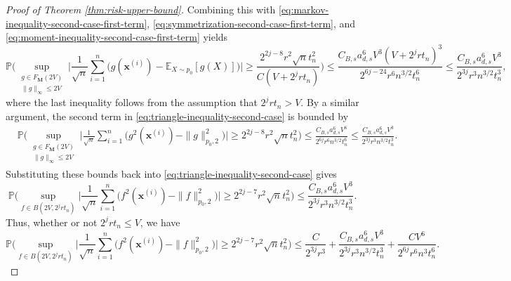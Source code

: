 \documentclass[10pt]{article}
\newcommand{\E}{{\mathbb E}}
\renewcommand{\P}{{\mathbb P}}
\newcommand{\xbf}{{\mathbf{x}}}
\newcommand{\Mbf}{{\mathbf{M}}}
\begin{document}
\begin{proof}[Proof of Theorem \ref{thm:risk-upper-bound}]
Combining this with \eqref{eq:markov-inequality-second-case-first-term}, 
\eqref{eq:symmetrization-second-case-first-term}, and
\eqref{eq:moment-inequality-second-case-first-term} yields
\begin{equation*}
    \P\Big(\sup_{\substack{g \in F_{\Mbf}(2V) \\ \|g\|_{\infty} \le 2V}} 
    \Big|\frac{1}{\sqrt{n}} \sum_{i = 1}^{n} \big(g(\xbf^{(i)}) 
    - \E_{X \sim p_0}[g(X)]\big)\Big| 
    \ge \frac{2^{2j - 8} r^2 \sqrt{n}t_n^2}{C(V + 2^j r t_n)} \Big) \le \frac{C_{B, s} 
    a_{d, s}^6 V^3(V + 2^j r t_n)^3}{2^{6j - 24} r^6 n^{3/2} t_n^6}
    \le \frac{C_{B, s} a_{d, s}^6 V^3}{2^{3j} r^3 n^{3/2} t_n^3},
\end{equation*}
where the last inequality follows from the assumption that $2^j r t_n > V$.
By a similar argument, the second term in
\eqref{eq:triangle-inequality-second-case} is bounded by
\begin{equation*}
\begin{aligned}
    &\P\Big(\sup_{\substack{g \in F_{\Mbf}(2V) \\ \|g\|_{\infty} \le 2V}} 
    \Big|\frac{1}{\sqrt{n}} \sum_{i = 1}^{n} \big(g^2(\xbf^{(i)}) 
    -\|g\|_{p_0, 2}^2\big)\Big| \ge 2^{2j - 8} r^2 \sqrt{n}t_n^2 \Big) 
    \le \frac{C_{B, s} a_{d, s}^6 V^6}{2^{6j} r^6 n^{3/2} t_n^6} 
    \le \frac{C_{B, s} a_{d, s}^6 V^3}{2^{3j} r^3 n^{3/2} t_n^3}.
\end{aligned}
\end{equation*}
Substituting these bounds back into \eqref{eq:triangle-inequality-second-case}
gives
\begin{equation*}
    \P\Big(\sup_{f \in B(2V, 2^j r t_n)} 
    \Big|\frac{1}{\sqrt{n}} \sum_{i = 1}^{n} \big(f^2(\xbf^{(i)}) 
    -\|f\|_{p_0, 2}^2\big)\Big| \ge 2^{2j - 7} r^2 \sqrt{n}t_n^2 \Big)
    \le \frac{C_{B, s} a_{d, s}^6 V^3}{2^{3j} r^3 n^{3/2} t_n^3}.
\end{equation*}
Thus, whether or not $2^j r t_n \le V$, we have
\begin{equation*}
    \P\Big(\sup_{f \in B(2V, 2^j r t_n)} 
    \Big|\frac{1}{\sqrt{n}} \sum_{i = 1}^{n} \big(f^2(\xbf^{(i)}) 
    -\|f\|_{p_0, 2}^2\big) \Big| \ge 2^{2j - 7} r^2 \sqrt{n}t_n^2 \Big)
    \le \frac{C}{2^{3j} r^3} 
    + \frac{C_{B, s} a_{d, s}^6 V^3}{2^{3j} r^3 n^{3/2} t_n^3} 
    + \frac{CV^6}{2^{6j} r^6 n^3 t_n^6}.
\end{equation*}
    

\end{proof}
\end{document}
